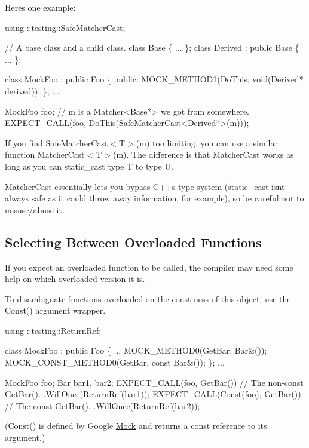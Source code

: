 Here\textquotesingle{}s one example\+:


\begin{DoxyCode}
using ::testing::SafeMatcherCast;

// A base class and a child class.
class Base \{ ... \};
class Derived : public Base \{ ... \};

class MockFoo : public Foo \{
 public:
  MOCK\_METHOD1(DoThis, void(Derived* derived));
\};
...

  MockFoo foo;
  // m is a Matcher<Base*> we got from somewhere.
  EXPECT\_CALL(foo, DoThis(SafeMatcherCast<Derived*>(m)));
\end{DoxyCode}


If you find {\ttfamily Safe\+Matcher\+Cast$<$T$>$(m)} too limiting, you can use a similar function {\ttfamily Matcher\+Cast$<$T$>$(m)}. The difference is that {\ttfamily Matcher\+Cast} works as long as you can {\ttfamily static\+\_\+cast} type {\ttfamily T} to type {\ttfamily U}.

{\ttfamily Matcher\+Cast} essentially lets you bypass C++\textquotesingle{}s type system ({\ttfamily static\+\_\+cast} isn\textquotesingle{}t always safe as it could throw away information, for example), so be careful not to misuse/abuse it.

\subsection*{Selecting Between Overloaded Functions}

If you expect an overloaded function to be called, the compiler may need some help on which overloaded version it is.

To disambiguate functions overloaded on the const-\/ness of this object, use the {\ttfamily Const()} argument wrapper.


\begin{DoxyCode}
using ::testing::ReturnRef;

class MockFoo : public Foo \{
  ...
  MOCK\_METHOD0(GetBar, Bar&());
  MOCK\_CONST\_METHOD0(GetBar, const Bar&());
\};
...

  MockFoo foo;
  Bar bar1, bar2;
  EXPECT\_CALL(foo, GetBar())         // The non-const GetBar().
      .WillOnce(ReturnRef(bar1));
  EXPECT\_CALL(Const(foo), GetBar())  // The const GetBar().
      .WillOnce(ReturnRef(bar2));
\end{DoxyCode}


({\ttfamily Const()} is defined by Google \hyperlink{class_mock}{Mock} and returns a {\ttfamily const} reference to its argument.)

